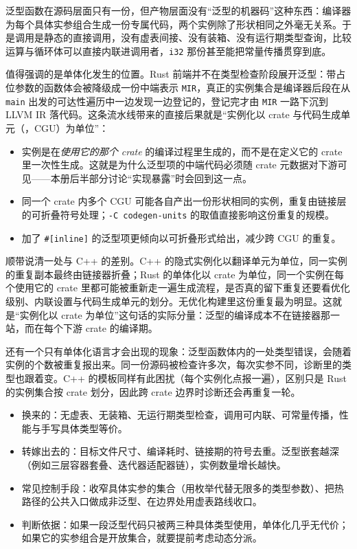 \documentclass[12pt,a4paper,fontset=fandol]{ctexbook}
\newcommand{\cpp}[1]{C++#1}
\newcommand{\kw}[1]{\texttt{#1}}
\newcommand{\seqkw}[1]{\seqsplit{\texttt{#1}}}
\begin{document}
泛型函数在源码层面只有一份，但产物层面没有“泛型的机器码”这种东西：编译器为每个具体实参组合生成一份专属代码，两个实例除了形状相同之外毫无关系。于是调用是静态的直接调用，没有虚表间接、没有装箱、没有运行期类型查询，比较运算与循环体可以直接内联进调用者，\kw{i32} 那份甚至能把常量传播贯穿到底。

值得强调的是单体化发生的位置。Rust 前端并不在类型检查阶段展开泛型：带占位参数的函数体会被降级成一份中端表示 \kw{MIR}，真正的实例集合是编译器后段在从 \kw{main} 出发的可达性遍历中一边发现一边登记的，登记完才由 \kw{MIR} 一路下沉到 LLVM IR 落代码。这条流水线带来的直接后果就是“实例化以 crate 与代码生成单元（\seqkw{codegen\allowbreak{} unit}，CGU）为单位”：

\begin{itemize}
  \item 实例是在\emph{使用它的那个 crate} 的编译过程里生成的，而不是在定义它的 crate 里一次性生成。这就是为什么泛型项的中端代码必须随 crate 元数据对下游可见——本册后半部分讨论“实现暴露”时会回到这一点。
  \item 同一个 crate 内多个 CGU 可能各自产出一份形状相同的实例，重复由链接层的可折叠符号处理；\kw{-C codegen-units} 的取值直接影响这份重复的规模。
  \item 加了 \kw{\#[inline]} 的泛型项更倾向以可折叠形式给出，减少跨 CGU 的重复。
\end{itemize}

顺带说清一处与 \cpp{} 的差别。\cpp{} 的隐式实例化以翻译单元为单位，同一实例的重复副本最终由链接器折叠；Rust 的单体化以 crate 为单位，同一个实例在每个使用它的 crate 里都可能被重新走一遍生成流程，是否真的留下重复还要看优化级别、内联设置与代码生成单元的划分。无优化构建里这份重复最为明显。这就是“实例化以 crate 为单位”这句话的实际分量：泛型的编译成本不在链接器那一站，而在每个下游 crate 的编译期。

还有一个只有单体化语言才会出现的现象：泛型函数体内的一处类型错误，会随着实例的个数被重复报出来。同一份源码被检查许多次，每次实参不同，诊断里的类型也跟着变。\cpp{} 的模板同样有此困扰（每个实例化点报一遍），区别只是 Rust 的实例集合按 crate 划分，因此跨 crate 边界时诊断还会再重复一轮。

\begin{guideline}[title={单体化是零成本抽象，但成本并没有消失，只是转嫁}]
  \begin{itemize}
    \item 换来的：无虚表、无装箱、无运行期类型检查，调用可内联、可常量传播，性能与手写具体类型等价。
    \item 转嫁出去的：目标文件尺寸、编译耗时、链接期的符号去重。泛型嵌套越深（例如三层容器套叠、迭代器适配器链），实例数量增长越快。
    \item 常见控制手段：收窄具体实参的集合（用枚举代替无限多的类型参数）、把热路径的公共入口做成非泛型、在边界处用虚表路线收口。
    \item 判断依据：如果一段泛型代码只被两三种具体类型使用，单体化几乎无代价；如果它的实参组合是开放集合，就要提前考虑动态分派。
  \end{itemize}
\end{guideline}
\end{document}
